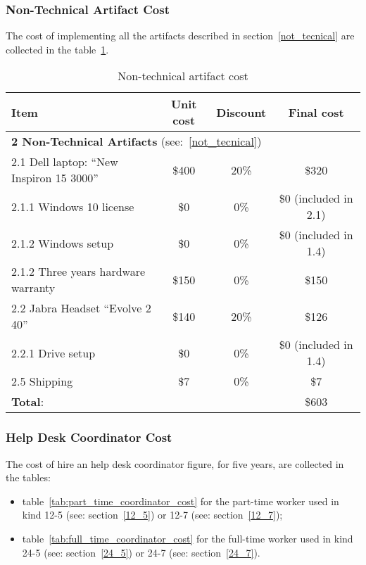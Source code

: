 \subsubsection{Non-Technical Artifact Cost}
The cost of implementing all the artifacts described in section~\ref{not_tecnical} are collected in the table~\ref{tab:not_tecnical_cost}.

\begin{table}[H]
	\centering
	\begin{tabular}{|l|c|c|c|} 
		\hline
		\textbf{Item} & \textbf{Unit cost} & \textbf{Discount} & \textbf{Final cost}   \\
		\hline
		\multicolumn{4}{|l|}{\textbf{2 Non-Technical Artifacts} (see:~\ref{not_tecnical})}\\
		\hline
		\hspace{2mm}2.1 Dell laptop: \textquotedblleft New Inspiron 15 3000\textquotedblright\cite{dellpc} & \$400 & 20\% & \$320\\
		\hline
		\hspace{4mm}2.1.1 Windows 10 license & \$0 & 0\% & \$0 (included in 2.1)\\
		\hline
		\hspace{4mm}2.1.2 Windows setup  & \$0 & 0\% & \$0 (included in 1.4)\\
		\hline
		\hspace{4mm}2.1.2 Three years hardware warranty	& \$150 & 0\% & \$150 \\
		\hline
		\hspace{2mm}2.2 Jabra Headset \textquotedblleft Evolve 2 40\textquotedblright\cite{jabraheadsets} & \$140 & 20\% & \$126\\
		\hline
		\hspace{4mm}2.2.1 Drive setup & \$0 & 0\% & \$0 (included in 1.4)\\
		\hline
		\hspace{2mm}2.5 Shipping  & \$7 & 0\% & \$7\\
		\hline
		\multicolumn{3}{|l|}{\textbf{Total}:} & \$603\\
		\hline
	\end{tabular}
	\caption{Non-technical artifact cost}\label{tab:not_tecnical_cost}
\end{table}

\subsubsection{Help Desk Coordinator Cost}
The cost of hire an help desk coordinator figure, for five years, are collected in the tables:
\begin{itemize}
	\item table~\ref{tab:part_time_coordinator_cost} for the part-time worker used in kind 12{-}5 (see: section~\ref{12_5}) or 12{-}7 (see: section~\ref{12_7});
	\item table~\ref{tab:full_time_coordinator_cost} for the full-time worker used in kind 24{-}5 (see: section~\ref{24_5}) or 24{-}7 (see: section~\ref{24_7}).
\end{itemize}

